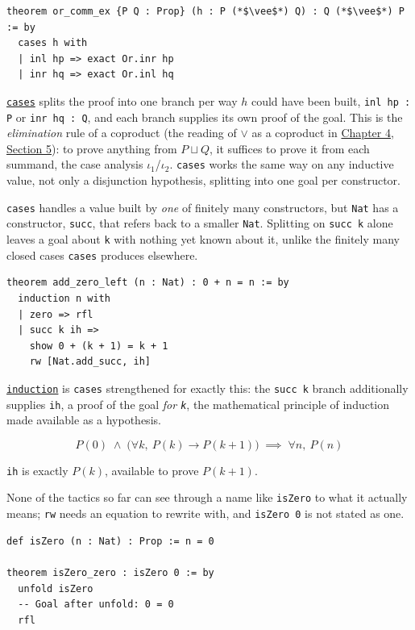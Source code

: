 \begin{lstlisting}
theorem or_comm_ex {P Q : Prop} (h : P (*$\vee$*) Q) : Q (*$\vee$*) P := by
  cases h with
  | inl hp => exact Or.inr hp
  | inr hq => exact Or.inl hq
\end{lstlisting}

\href{https://lean-lang.org/doc/reference/latest/Tactic-Proofs/Tactic-Reference/}{\texttt{cases}} splits the proof into one branch per way \(h\) could have been built, \texttt{inl hp : P} or \texttt{inr hq : Q}, and each branch supplies its own proof of the goal. This is the \emph{elimination} rule of a coproduct (the reading of \(\vee\) as a coproduct in \hyperref[sec:04-propositions-and-proofs:05-and-or-not:1]{Chapter 4, Section 5}): to prove anything from \(P \sqcup Q\), it suffices to prove it from each summand, the case analysis \(\iota_1\)/\(\iota_2\). \texttt{cases} works the same way on any inductive value, not only a disjunction hypothesis, splitting into one goal per constructor.

\texttt{cases} handles a value built by \emph{one} of finitely many constructors, but \texttt{Nat} has a constructor, \texttt{succ}, that refers back to a smaller \texttt{Nat}. Splitting on \texttt{succ k} alone leaves a goal about \texttt{k} with nothing yet known about it, unlike the finitely many closed cases \texttt{cases} produces elsewhere.

\begin{lstlisting}
theorem add_zero_left (n : Nat) : 0 + n = n := by
  induction n with
  | zero => rfl
  | succ k ih =>
    show 0 + (k + 1) = k + 1
    rw [Nat.add_succ, ih]
\end{lstlisting}

\href{https://lean-lang.org/doc/reference/latest/Tactic-Proofs/Tactic-Reference/}{\texttt{induction}} is \texttt{cases} strengthened for exactly this: the \texttt{succ k} branch additionally supplies \texttt{ih}, a proof of the goal \emph{for \texttt{k}}, the mathematical principle of induction made available as a hypothesis.

\[
P(0) \;\land\; \big(\forall k,\ P(k) \to P(k+1)\big) \;\implies\; \forall n,\ P(n)
\]

\texttt{ih} is exactly \(P(k)\), available to prove \(P(k+1)\).

None of the tactics so far can see through a name like \texttt{isZero} to what it actually means; \texttt{rw} needs an equation to rewrite with, and \texttt{isZero 0} is not stated as one.

\begin{lstlisting}
def isZero (n : Nat) : Prop := n = 0

theorem isZero_zero : isZero 0 := by
  unfold isZero
  -- Goal after unfold: 0 = 0
  rfl
\end{lstlisting}

